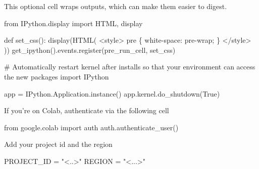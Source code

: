 \documentclass[
  letterpaper,
  DIV=11,
  numbers=noendperiod]{scrreprt}
\newenvironment{Shaded}{\begin{snugshade}}{\end{snugshade}}
\newcommand{\CommentTok}[1]{\textcolor[rgb]{0.37,0.37,0.37}{#1}}
\newcommand{\ImportTok}[1]{\textcolor[rgb]{0.00,0.46,0.62}{#1}}
\newcommand{\KeywordTok}[1]{\textcolor[rgb]{0.00,0.23,0.31}{#1}}
\newcommand{\NormalTok}[1]{\textcolor[rgb]{0.00,0.23,0.31}{#1}}
\newcommand{\OperatorTok}[1]{\textcolor[rgb]{0.37,0.37,0.37}{#1}}
\newcommand{\StringTok}[1]{\textcolor[rgb]{0.13,0.47,0.30}{#1}}
\newcommand{\VariableTok}[1]{\textcolor[rgb]{0.07,0.07,0.07}{#1}}
\begin{document}
This optional cell wraps outputs, which can make them easier to digest.

\begin{Shaded}
\begin{Highlighting}[]
\ImportTok{from}\NormalTok{ IPython.display }\ImportTok{import}\NormalTok{ HTML, display}

\KeywordTok{def}\NormalTok{ set\_css():}
\NormalTok{  display(HTML(}\StringTok{\textquotesingle{}\textquotesingle{}\textquotesingle{}}
\StringTok{  \textless{}style\textgreater{}}
\StringTok{    pre \{}
\StringTok{        white{-}space: pre{-}wrap;}
\StringTok{    \}}
\StringTok{  \textless{}/style\textgreater{}}
\StringTok{  \textquotesingle{}\textquotesingle{}\textquotesingle{}}\NormalTok{))}
\NormalTok{get\_ipython().events.register(}\StringTok{\textquotesingle{}pre\_run\_cell\textquotesingle{}}\NormalTok{, set\_css)}
\end{Highlighting}
\end{Shaded}

\begin{Shaded}
\begin{Highlighting}[]
\CommentTok{\# Automatically restart kernel after installs so that your environment can access the new packages}
\ImportTok{import}\NormalTok{ IPython}

\NormalTok{app }\OperatorTok{=}\NormalTok{ IPython.Application.instance()}
\NormalTok{app.kernel.do\_shutdown(}\VariableTok{True}\NormalTok{)}
\end{Highlighting}
\end{Shaded}

If you're on Colab, authenticate via the following cell

\begin{Shaded}
\begin{Highlighting}[]
\ImportTok{from}\NormalTok{ google.colab }\ImportTok{import}\NormalTok{ auth}
\NormalTok{auth.authenticate\_user()}
\end{Highlighting}
\end{Shaded}

Add your project id and the region

\begin{Shaded}
\begin{Highlighting}[]
\NormalTok{PROJECT\_ID }\OperatorTok{=} \StringTok{"\textless{}..\textgreater{}"}
\NormalTok{REGION }\OperatorTok{=} \StringTok{"\textless{}...\textgreater{}"}
\end{Highlighting}
\end{Shaded}
\end{document}

